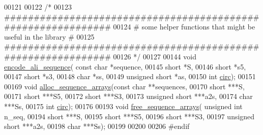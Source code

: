 \begin{DoxyCode}
00121 
00122 \textcolor{comment}{/*}
00123 \textcolor{comment}{#############################################################}
00124 \textcolor{comment}{# some helper functions that might be useful in the library #}
00125 \textcolor{comment}{#############################################################}
00126 \textcolor{comment}{*/}
00127 
00144 \textcolor{keywordtype}{void} \hyperlink{group__consensus__fold_gaa3e40277c837d6f7603afe319884c786}{encode\_ali\_sequence}( \textcolor{keyword}{const} \textcolor{keywordtype}{char} *sequence,
00145                           \textcolor{keywordtype}{short} *S,
00146                           \textcolor{keywordtype}{short} *s5,
00147                           \textcolor{keywordtype}{short} *s3,
00148                           \textcolor{keywordtype}{char} *ss,
00149                           \textcolor{keywordtype}{unsigned} \textcolor{keywordtype}{short} *as,
00150                           \textcolor{keywordtype}{int} \hyperlink{group__model__details_gaf9202a1a09f5828dc731e2d9a10fa111}{circ});
00151 
00169 \textcolor{keywordtype}{void}  \hyperlink{group__consensus__fold_ga8a560930f7f2582cc3967723a86cfdfa}{alloc\_sequence\_arrays}(\textcolor{keyword}{const} \textcolor{keywordtype}{char} **sequences,
00170                             \textcolor{keywordtype}{short} ***S,
00171                             \textcolor{keywordtype}{short} ***S5,
00172                             \textcolor{keywordtype}{short} ***S3,
00173                             \textcolor{keywordtype}{unsigned} \textcolor{keywordtype}{short} ***a2s,
00174                             \textcolor{keywordtype}{char} ***Ss,
00175                             \textcolor{keywordtype}{int} \hyperlink{group__model__details_gaf9202a1a09f5828dc731e2d9a10fa111}{circ});
00176 
00193 \textcolor{keywordtype}{void}  \hyperlink{group__consensus__fold_ga298a420a8c879202e2617b3f724fde38}{free\_sequence\_arrays}( \textcolor{keywordtype}{unsigned} \textcolor{keywordtype}{int} n\_seq,
00194                             \textcolor{keywordtype}{short} ***S,
00195                             \textcolor{keywordtype}{short} ***S5,
00196                             \textcolor{keywordtype}{short} ***S3,
00197                             \textcolor{keywordtype}{unsigned} \textcolor{keywordtype}{short} ***a2s,
00198                             \textcolor{keywordtype}{char} ***Ss);
00199 
00200 
00206 \textcolor{preprocessor}{#endif}
\end{DoxyCode}
